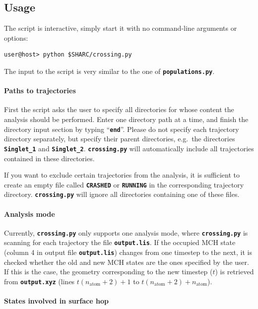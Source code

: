 \documentclass[a4paper,11pt,DIV=15,openany,twoside=false]{scrbook}
\newcommand{\ttt}[1]{\textbf{\texttt{#1}}}
\begin{document}
\subsection{Usage}

The script is interactive, simply start it with no command-line arguments or options:
\begin{verbatim}
user@host> python $SHARC/crossing.py
\end{verbatim}

The input to the script is very similar to the one of \ttt{populations.py}. 

\paragraph{Paths to trajectories}

First the script asks the user to specify all directories for whose content the analysis should be performed. Enter one directory path at a time, and finish the directory input section by typing ``\ttt{end}''. Please do not specify each trajectory directory separately, but specify their parent directories, e.g.\ the directories \ttt{Singlet\_1} and \ttt{Singlet\_2}. \ttt{crossing.py} will automatically include all trajectories contained in these directories.

If you want to exclude certain trajectories from the analysis, it is sufficient to create an empty file called \ttt{CRASHED} or \ttt{RUNNING} in the corresponding trajectory directory. \ttt{crossing.py} will ignore all directories containing one of these files.

\paragraph{Analysis mode}

Currently, \ttt{crossing.py} only supports one analysis mode, where \ttt{crossing.py} is scanning for each trajectory the file \ttt{output.lis}. If the occupied MCH state (column 4 in output file \ttt{output.lis}) changes from one timestep to the next, it is checked whether the old and new MCH states are the ones specified by the user. If this is the case, the geometry corresponding to the new timestep ($t$) is retrieved from \ttt{output.xyz} (lines $t(n_{\text{atom}}+2)+1$ to $t(n_{\text{atom}}+2)+n_{\text{atom}}$). 

\paragraph{States involved in surface hop}
\end{document}

